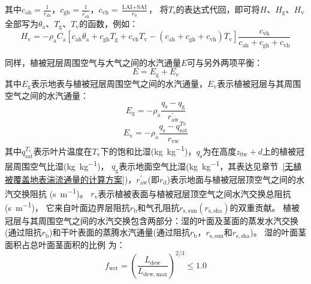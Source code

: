 其中$c_{\mathrm{ah}}=\frac{1}{r_{\mathrm{ah}}}$，$c_{\mathrm{gh}}=\frac{1}{r_{\mathrm{ah}}^\prime}$，$c_{\mathrm{vh}}=\frac{\text {LAI}+\text {SAI}}{r_{\mathrm {b}}}$，
将$T_{\mathrm {s}}$的表达式代回，即可将$H$、$H_{\mathrm{g}}$、$H_{\mathrm{v}}$全部写为$\theta_{\mathrm{a}}$、$T_{\mathrm {g}}$、$T_{\mathrm v}$的函数，例如：
\begin{equation}
  H_{\mathrm{v}}=-\rho_{\mathrm{a}} C_{\mathrm{a}}\left[c_{\mathrm{ah}} \theta_{\mathrm{a}}+c_{\mathrm{gh}}
    T_{\mathrm{g}}+c_{\mathrm{vh}} T_{\mathrm{v}}-\left(c_{\mathrm{ah}}+c_{\mathrm{gh}}+c_{\mathrm{vh}}\right)
  T_{\mathrm{v}}\right] \frac{c_{\mathrm{vh}}}{c_{\mathrm{ah}}+c_{\mathrm{gh}}+c_{\mathrm{vh}}}
\end{equation}


同样，植被冠层周围空气与大气之间的水汽通量$E$可与另外两项平衡：
\begin{equation}\label{EV_balance}
  E=E_{\mathrm{g}}+E_{\mathrm{v}}
\end{equation}
其中$E_{\mathrm{g}}$表示地表与植被冠层周围空气之间的水汽通量，$E_{\mathrm{v}}$表示植被冠层与其周围空气之间的水汽通量：
\begin{equation}\label{eq:Eg}
  E_{\mathrm{g}}=-\rho_{\mathrm{a}} \frac{q_{\mathrm{s}}-q_{\mathrm{g}}}{r_{\mathrm{a w}}^{\prime}}
\end{equation}
\begin{equation}
  E_{\mathrm{v}}=-\rho_{\mathrm{a}} \frac{q_{\mathrm{s}}-q_{\mathrm{s a t}}^{T v}}{r_{\mathrm{vw}}}
\end{equation}
其中$q_{\mathrm{sat}}^{T_{\mathrm v}}$表示叶片温度在$T_{\mathrm v}$下的饱和比湿(\unit{kg.kg^{-1}})，$q_{\mathrm {s}}$为在高度$z_{\mathrm{0w}}+d$上的植被冠层周围空气比湿(\unit{kg.kg^{-1}})，
$q_{\mathrm {g}}$表示地面空气比湿(\unit{kg.kg^{-1}}，其表达见章节~\ref{无植被覆盖地表湍流通量的计算方案})，$r_{\mathrm{aw}}^\prime$(即$r_{\mathrm {d}}$)表示地面与植被冠层顶空气之间的水汽交换阻抗 (\unit{s.m^{-1}})。
$r_{\mathrm{v}}$表示植被表面与植被冠层顶空气之间水汽交换总阻抗 (\unit{s.m^{-1}})，
它来自叶面边界层阻抗$r_{\mathrm {b}}$和气孔阻抗$r_{\mathrm{s,sun}}\left(r_{\mathrm{s,sha}}\right)$的双重贡献。
植被冠层与其周围空气之间的水汽交换包含两部分：湿的叶面及茎面的蒸发水汽交换(通过阻抗$r_{\mathrm {b}}$)和干叶表面的蒸腾水汽通量(通过阻抗$r_{\mathrm {b}}$，$r_{\mathrm{s,sun}}$和$r_{\mathrm{s,sha}}$)。
湿的叶面茎面积占总叶面茎面积的比例 \citep{dickinson1993biosphere} 为：
\begin{equation}\label{eq:fwet}
  f_{\mathrm{wet}}=\left(\frac{L_{\mathrm{dew}}}{L_{\mathrm{dew,max }}}\right)^{2 / 3} \leqslant 1.0
\end{equation}
